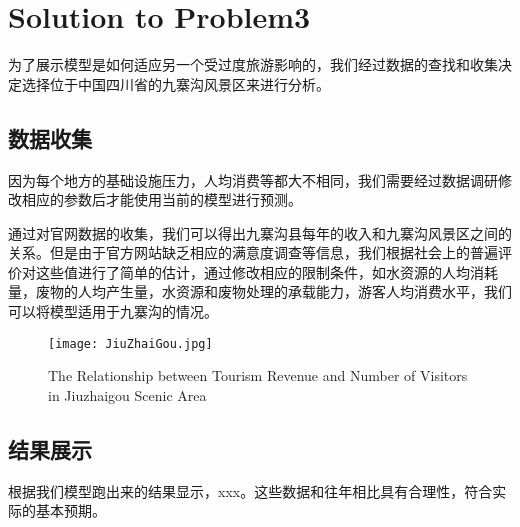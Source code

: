 \documentclass[12pt]{article}  %
\begin{document}


\section{Solution to Problem3}
为了展示模型是如何适应另一个受过度旅游影响的，我们经过数据的查找和收集决定选择位于中国四川省的九寨沟风景区来进行分析。
\subsection{数据收集}
因为每个地方的基础设施压力，人均消费等都大不相同，我们需要经过数据调研修改相应的参数后才能使用当前的模型进行预测。

通过对官网数据的收集\cite{8}，我们可以得出九寨沟县每年的收入和九寨沟风景区之间的关系。但是由于官方网站缺乏相应的满意度调查等信息，我们根据社会上的普遍评价对这些值进行了简单的估计，通过修改相应的限制条件，如水资源的人均消耗量，废物的人均产生量，水资源和废物处理的承载能力，游客人均消费水平，我们可以将模型适用于九寨沟的情况。
\begin{figure}[H]
	\centering
	\texttt{[image: JiuZhaiGou.jpg]}
	\caption{The Relationship between Tourism Revenue and Number of Visitors in Jiuzhaigou Scenic Area}\label{fig:JiuZhaiGou}
\end{figure}
\subsection{结果展示}
根据我们模型跑出来的结果显示，xxx。这些数据和往年相比具有合理性，符合实际的基本预期。
\end{document}
